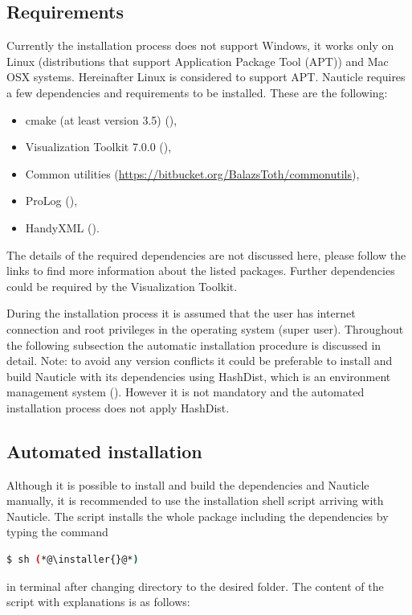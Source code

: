\documentclass[a4paper,12pt,openany]{book}
\newcommand{\myhref}[3][nauticlegreen_dark]{\href{#2}{\color{#1}{#3}}}%
\theoremstyle{break}
\begin{document}
\subsection{Requirements}
Currently the installation process does not support Windows, it works only on Linux (distributions that support Application Package Tool (APT)) and Mac OSX systems. Hereinafter Linux is considered to support APT.
Nauticle requires a few dependencies and requirements to be installed. These are the following:
\begin{itemize}
  \item cmake (at least version 3.5) (\myhref{https://cmake.org/download/}{https://cmake.org/download/}),
  \item Visualization Toolkit 7.0.0 (\myhref{http://www.vtk.org/files/release/7.0/VTK-7.0.0.zip}{http://www.vtk.org/files/release/7.0/VTK-7.0.0.zip}),
  \item Common utilities (\href{https://bitbucket.org/BalazsToth/commonutils}{https://bitbucket.org/BalazsToth/commonutils}),
  \item ProLog (\myhref{https://bitbucket.org/BalazsToth/prolog}{https://bitbucket.org/BalazsToth/prolog}),
  \item HandyXML (\myhref{https://bitbucket.org/BalazsToth/handyxml}{https://bitbucket.org/BalazsToth/handyxml}).
\end{itemize}
The details of the required dependencies are not discussed here, please follow the links to find more information about the listed packages. Further dependencies could be required by the Visualization Toolkit.

During the installation process it is assumed that the user has internet connection and root privileges in the operating system (super user). Throughout the following subsection the automatic installation procedure is discussed in detail.
Note: to avoid any version conflicts it could be preferable to install and build Nauticle with its dependencies using HashDist, which is an environment management system (\myhref{https://github.com/hashdist/hashdist}{https://github.com/hashdist/ hashdist}). However it is not mandatory and the automated installation process does not apply HashDist.
\subsection{Automated installation}
Although it is possible to install and build the dependencies and Nauticle manually, it is recommended to use the installation shell script arriving with Nauticle. The script installs the whole package including the dependencies by typing the command
\begin{lstlisting}[language=bash]
  $ sh (*@\installer{}@*)
\end{lstlisting}
in terminal after changing directory to the desired folder. The content of the script with explanations is as follows:
\end{document}
